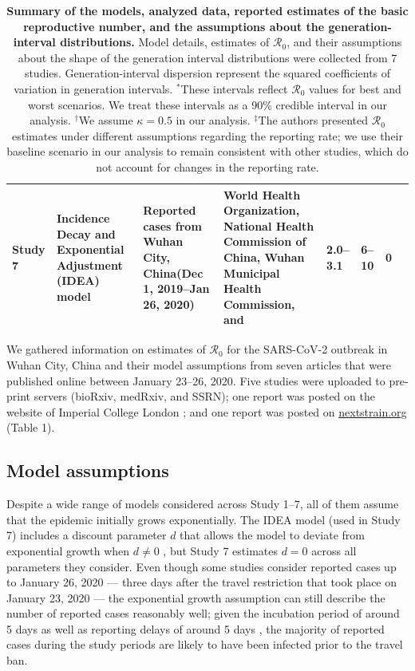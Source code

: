 \documentclass[12pt]{article}
\newcommand{\Ro}{\ensuremath{{\mathcal R}_{0}}\xspace}
\begin{document}
{\begin{landscape}
\begin{table}[!th]
\begin{center}
\begin{tabular}{l|L{2cm}|L{3.2cm}|L{2.8cm}|L{2.5cm}|L{2.4cm}|L{2.7cm}|L{2cm}}
\hline
Study 7 & Incidence Decay and Exponential Adjustment (IDEA) model & Reported cases from Wuhan City, China\newline (Dec 1, 2019--Jan 26, 2020) & World	Health Organization, National Health Commission of China, Wuhan Municipal	Health Commission, and \cite{huang2020clinical} & 2.0--3.1 & 6--10 & 0 & \cite{majumderncov} \\
\hline
\end{tabular}
\end{center}
\caption{
\textbf{Summary of the models, analyzed data, reported estimates of the basic reproductive number, and the assumptions about the generation-interval distributions.}
Model details, estimates of \Ro, and their assumptions about the shape of the generation interval distributions were collected from 7 studies.
Generation-interval dispersion represent the squared coefficients of variation in generation intervals.
$^\ast$These intervals reflect \Ro values for best and worst scenarios. We treat these intervals as a 90\% credible interval in our analysis.
$^\dagger$We assume $\kappa = 0.5$ in our analysis.
$^\ddagger$The authors presented \Ro estimates under different assumptions regarding the reporting rate; we use their baseline scenario in our analysis to remain consistent with other studies, which do not account for changes in the reporting rate.
}
\end{table}
\end{landscape}
\clearpage
}

We gathered information on estimates of \Ro for the SARS-CoV-2 outbreak in Wuhan City, China and their model assumptions from seven articles that were published online between January 23--26, 2020.
Five studies \citep{liuncov, majumderncov, readncov, riouncov, zhaoncov} were uploaded to pre-print servers (bioRxiv, medRxiv, and SSRN); one report was posted on the website of Imperial College London \citep{imaincov}; and one report was posted on \url{nextstrain.org} \citep{bedfordncov} (Table 1).

\subsection{Model assumptions}

Despite a wide range of models considered across Study 1--7, all of them assume that the epidemic initially grows exponentially.
The IDEA model (used in Study 7) includes a discount parameter $d$ that allows the model to deviate from exponential growth when $d \neq 0$ \citep{fisman2013idea}, but Study 7 estimates $d=0$ across all parameters they consider.
Even though some studies consider reported cases up to January 26, 2020 --- three days after the travel restriction that took place on January 23, 2020 \citep{Tianeabb6105} --- the exponential growth assumption can still describe the number of reported cases reasonably well;
given the incubation period of around 5 days \citep{lauer2020incubation} as well as reporting delays of around 5 days \citep{sun2020early}, the majority of reported cases during the study periods are likely to have been infected prior to the travel ban.
\end{document}
